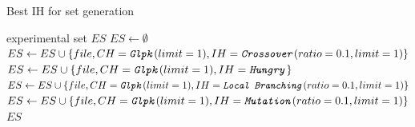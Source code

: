 \begin{algorithm}
\caption{Best IH for  set generation}
\label{listing-experiment-best-ih-for-glpk}
\begin{algorithmic}
\ENSURE experimental set $ES$
\STATE $ES \gets \emptyset$
    	\STATE $ES \gets ES \cup \{file, CH = \texttt{\textit{Glpk}}(limit = 1), IH = \texttt{\textit{Crossover}}(ratio = 0.1, limit = 1)\}$
    	\STATE $ES \gets ES \cup \{file, CH = \texttt{\textit{Glpk}}(limit = 1), IH = \texttt{\textit{Hungry}}\}$
    	\STATE $ES \gets ES \cup \{file, CH = \texttt{\textit{Glpk}}(limit = 1), IH = \texttt{\textit{Local Branching}}(ratio = 0.1, limit = 1)\}$
    	\STATE $ES \gets ES \cup \{file, CH = \texttt{\textit{Glpk}}(limit = 1), IH = \texttt{\textit{Mutation}}(ratio = 0.1, limit = 1)\}$
  \ENDFOR
\ENDFOR
\RETURN $ES$
\end{algorithmic}
\end{algorithm}

